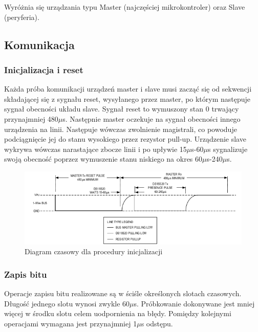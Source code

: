 \documentclass[a4paper]{article}
\begin{document}
Wyróżnia się urządzania typu Master (najczęściej mikrokontroler) oraz Slave (peryferia).

\subsection{Komunikacja}

\subsubsection{Inicjalizacja i reset}

Każda próba komunikacji urządzeń master i slave musi zacząć się od sekwencji składającej się z sygnału reset, wysyłanego przez master, po którym następuje sygnał obecności układu slave. Sygnał reset to wymuszony stan 0 trwający przynajmniej 480$\mu$s. Następnie master oczekuje na sygnał obecności innego urządzenia na linii. Następuje wówczas zwolnienie magistrali, co powoduje podciągnięcie jej do stanu wysokiego przez rezystor pull-up. Urządzenie slave wykrywa wówczas narastające zbocze linii i po upływie 15$\mu$s-60$\mu$s sygnalizuje swoją obecność poprzez wymuszenie stanu niskiego na okres 60$\mu$s-240$\mu$s.

\begin{figure}[H]
\begin{center}
\includegraphics[scale=0.4]{graphics/init.png}
\end{center}
\caption{Diagram czasowy dla procedury inicjalizacji}
\label{inititming}
\end{figure}

\subsubsection{Zapis bitu}
Operacje zapisu bitu realizowane są w ściśle określonych slotach czasowych. Długość jednego slotu wynosi zwykle 60$\mu$s. Próbkowanie dokonywane jest mniej więcej w środku slotu celem uodpornienia na błędy. Pomiędzy kolejnymi operacjami wymagana jest przynajmniej 1$\mu$s odstępu.
\end{document}
